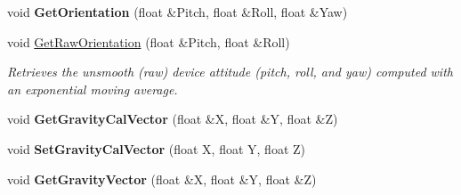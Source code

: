 \begin{DoxyCompactItemize}
\item 
\hypertarget{class_c_accelerometer_ae332fb3f201d67f554328fadaa343fe0}{void {\bfseries Get\-Orientation} (float \&Pitch, float \&Roll, float \&Yaw)}\label{class_c_accelerometer_ae332fb3f201d67f554328fadaa343fe0}

\item 
void \hyperlink{class_c_accelerometer_ab0b346cf6729449e31552f589b6430f8}{Get\-Raw\-Orientation} (float \&Pitch, float \&Roll)
\begin{DoxyCompactList}\small\item\em Retrieves the unsmooth (raw) device attitude (pitch, roll, and yaw) computed with an exponential moving average. \end{DoxyCompactList}\item 
\hypertarget{class_c_accelerometer_a8813b02e69b3072f4190b9779954b79d}{void {\bfseries Get\-Gravity\-Cal\-Vector} (float \&X, float \&Y, float \&Z)}\label{class_c_accelerometer_a8813b02e69b3072f4190b9779954b79d}

\item 
\hypertarget{class_c_accelerometer_afa6961a116ebc581da421b17b3976e92}{void {\bfseries Set\-Gravity\-Cal\-Vector} (float X, float Y, float Z)}\label{class_c_accelerometer_afa6961a116ebc581da421b17b3976e92}

\item 
\hypertarget{class_c_accelerometer_ad2b57ead77ae9d6abe9d28b070e0f891}{void {\bfseries Get\-Gravity\-Vector} (float \&X, float \&Y, float \&Z)}\label{class_c_accelerometer_ad2b57ead77ae9d6abe9d28b070e0f891}

\end{DoxyCompactItemize}
